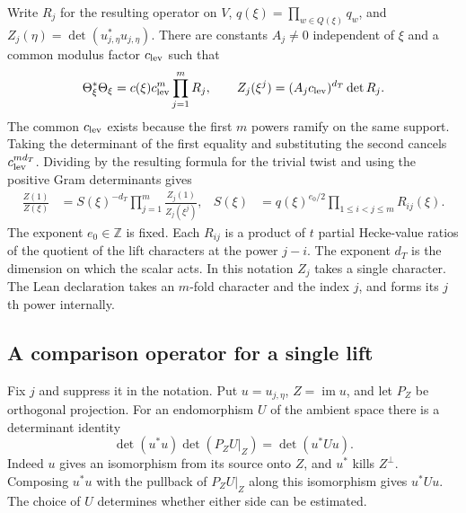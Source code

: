 Write $R_j$ for the resulting operator on $V$, $q(\xi)=\prod_{w\in Q(\xi)}q_w$, and $Z_j(\eta)=\det(u_{j,\eta}^*u_{j,\eta})$. There are constants $A_j\ne0$ independent of $\xi$ and a common modulus factor $c_{\rm lev}$ such that
\[
 \Theta_\xi^*\Theta_\xi=c(\xi)c_{\rm lev}^m\prod_{j=1}^m R_j,
 \qquad Z_j(\xi^j)=(A_jc_{\rm lev})^{d_T}\det R_j .
\]
The common $c_{\rm lev}$ exists because the first $m$ powers ramify on the same support. Taking the determinant of the first equality and substituting the second cancels $c_{\rm lev}^{md_T}$. Dividing by the resulting formula for the trivial twist and using the positive Gram determinants gives
\begin{align}
 \frac{Z(1)}{Z(\xi)}
 &= S(\xi)^{-d_T}\prod_{j=1}^{m}\frac{Z_j(1)}{Z_j(\xi^j)},&
 S(\xi)&=q(\xi)^{e_0/2}\prod_{1\le i<j\le m} R_{ij}(\xi).
 \label{eq:arithchain}
\end{align}
The exponent $e_0\in\mathbb Z$ is fixed. Each $R_{ij}$ is a product of $t$ partial Hecke-value ratios of the quotient of the lift characters at the power $j-i$. The exponent $d_T$ is the dimension on which the scalar acts. In this notation $Z_j$ takes a single character. The Lean declaration takes an $m$-fold character and the index $j$, and forms its $j$th power internally.

\subsection{A comparison operator for a single lift}
Fix $j$ and suppress it in the notation. Put $u=u_{j,\eta}$, $Z=\operatorname{im}u$, and let $P_Z$ be orthogonal projection. For an endomorphism $U$ of the ambient space there is a determinant identity
\[
 \det(u^*u)\det(P_ZU|_Z)=\det(u^*Uu).
\]
Indeed $u$ gives an isomorphism from its source onto $Z$, and $u^*$ kills $Z^\perp$. Composing $u^*u$ with the pullback of $P_ZU|_Z$ along this isomorphism gives $u^*Uu$. The choice of $U$ determines whether either side can be estimated.

